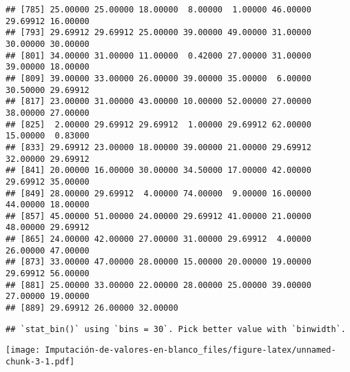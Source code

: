 \documentclass[
]{article}
\newenvironment{Shaded}{\begin{snugshade}}{\end{snugshade}}
\newcommand{\AttributeTok}[1]{\textcolor[rgb]{0.77,0.63,0.00}{#1}}
\newcommand{\FunctionTok}[1]{\textcolor[rgb]{0.00,0.00,0.00}{#1}}
\newcommand{\NormalTok}[1]{#1}
\newcommand{\OtherTok}[1]{\textcolor[rgb]{0.56,0.35,0.01}{#1}}
\newcommand{\SpecialCharTok}[1]{\textcolor[rgb]{0.00,0.00,0.00}{#1}}
\newcommand{\StringTok}[1]{\textcolor[rgb]{0.31,0.60,0.02}{#1}}
\begin{document}
\begin{verbatim}
## [785] 25.00000 25.00000 18.00000  8.00000  1.00000 46.00000 29.69912 16.00000
## [793] 29.69912 29.69912 25.00000 39.00000 49.00000 31.00000 30.00000 30.00000
## [801] 34.00000 31.00000 11.00000  0.42000 27.00000 31.00000 39.00000 18.00000
## [809] 39.00000 33.00000 26.00000 39.00000 35.00000  6.00000 30.50000 29.69912
## [817] 23.00000 31.00000 43.00000 10.00000 52.00000 27.00000 38.00000 27.00000
## [825]  2.00000 29.69912 29.69912  1.00000 29.69912 62.00000 15.00000  0.83000
## [833] 29.69912 23.00000 18.00000 39.00000 21.00000 29.69912 32.00000 29.69912
## [841] 20.00000 16.00000 30.00000 34.50000 17.00000 42.00000 29.69912 35.00000
## [849] 28.00000 29.69912  4.00000 74.00000  9.00000 16.00000 44.00000 18.00000
## [857] 45.00000 51.00000 24.00000 29.69912 41.00000 21.00000 48.00000 29.69912
## [865] 24.00000 42.00000 27.00000 31.00000 29.69912  4.00000 26.00000 47.00000
## [873] 33.00000 47.00000 28.00000 15.00000 20.00000 19.00000 29.69912 56.00000
## [881] 25.00000 33.00000 22.00000 28.00000 25.00000 39.00000 27.00000 19.00000
## [889] 29.69912 26.00000 32.00000
\end{verbatim}

\begin{Shaded}
\end{Shaded}

\begin{verbatim}
## `stat_bin()` using `bins = 30`. Pick better value with `binwidth`.
\end{verbatim}

\texttt{[image: Imputación-de-valores-en-blanco\_files/figure-latex/unnamed-chunk-3-1.pdf]}

\begin{Shaded}
\end{Shaded}
\end{document}
